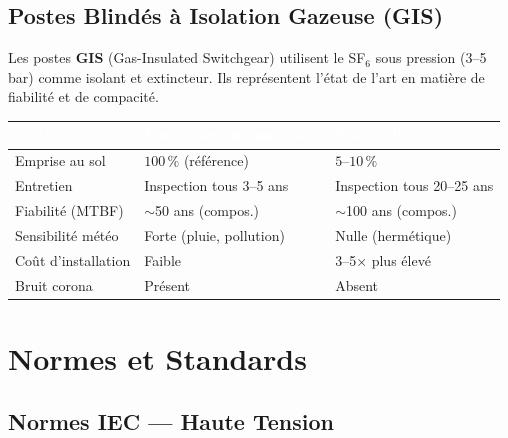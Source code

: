 \documentclass[12pt, a4paper, twoside]{report}
\begin{document}
\section{Postes Blindés à Isolation Gazeuse (GIS)}

Les postes \textbf{GIS} (Gas-Insulated Switchgear) utilisent le SF$_6$ sous pression
(3--5 bar) comme isolant et extincteur. Ils représentent l'état de l'art en matière
de fiabilité et de compacité.

\begin{center}
\begin{tabularx}{\textwidth}{lXX}
\toprule
\rowcolor{darkblue}
\textcolor{white}{\textbf{Critère}} &
\textcolor{white}{\textbf{Poste conventionnel (air)}} &
\textcolor{white}{\textbf{Poste GIS}} \\
\midrule
Emprise au sol & $100\,\%$ (référence) & $5$--$10\,\%$ \\
\rowcolor{lightgray}
Entretien & Inspection tous 3--5 ans & Inspection tous 20--25 ans \\
Fiabilité (MTBF) & $\sim$50 ans (compos.) & $\sim$100 ans (compos.) \\
\rowcolor{lightgray}
Sensibilité météo & Forte (pluie, pollution) & Nulle (hermétique) \\
Coût d'installation & Faible & 3--5× plus élevé \\
\rowcolor{lightgray}
Bruit corona & Présent & Absent \\
\bottomrule
\end{tabularx}
\end{center}

\chapter{Normes et Standards}

\section{Normes IEC — Haute Tension}
\end{document}
